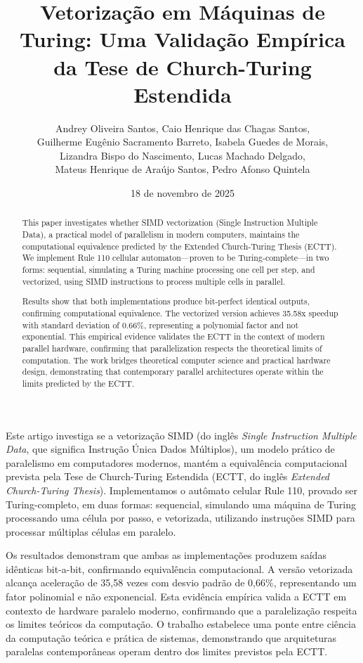 \documentclass[12pt]{article}
\title{Vetorização em Máquinas de Turing: Uma Validação Empírica da Tese de Church-Turing Estendida}
\author{
Andrey Oliveira Santos, Caio Henrique das Chagas Santos, \\
Guilherme Eugênio Sacramento Barreto, Isabela Guedes de Morais, \\
Lizandra Bispo do Nascimento, Lucas Machado Delgado, \\
Mateus Henrique de Araújo Santos, Pedro Afonso Quintela
}
\date{18 de novembro de 2025}
\affil{Universidade Tiradentes -- Sistemas de Informação}
\begin{document}
\maketitle

\begin{abstract}

This paper investigates whether SIMD vectorization (Single Instruction Multiple Data), a practical model of parallelism in modern computers, maintains the computational equivalence predicted by the Extended Church-Turing Thesis (ECTT). We implement Rule 110 cellular automaton—proven to be Turing-complete—in two forms: sequential, simulating a Turing machine processing one cell per step, and vectorized, using SIMD instructions to process multiple cells in parallel.

Results show that both implementations produce bit-perfect identical outputs, confirming computational equivalence. The vectorized version achieves 35.58x speedup with standard deviation of 0.66\%, representing a polynomial factor and not exponential. This empirical evidence validates the ECTT in the context of modern parallel hardware, confirming that parallelization respects the theoretical limits of computation. The work bridges theoretical computer science and practical hardware design, demonstrating that contemporary parallel architectures operate within the limits predicted by the ECTT.

\end{abstract}

\begin{resumo}

Este artigo investiga se a vetorização SIMD (do inglês \textit{Single Instruction Multiple Data}, que significa Instrução Única Dados Múltiplos), um modelo prático de paralelismo em computadores modernos, mantém a equivalência computacional prevista pela Tese de Church-Turing Estendida (ECTT, do inglês \textit{Extended Church-Turing Thesis}). Implementamos o autômato celular Rule 110, provado ser Turing-completo, em duas formas: sequencial, simulando uma máquina de Turing processando uma célula por passo, e vetorizada, utilizando instruções SIMD para processar múltiplas células em paralelo.

Os resultados demonstram que ambas as implementações produzem saídas idênticas bit-a-bit, confirmando equivalência computacional. A versão vetorizada alcança aceleração de 35,58 vezes com desvio padrão de 0,66\%, representando um fator polinomial e não exponencial. Esta evidência empírica valida a ECTT em contexto de hardware paralelo moderno, confirmando que a paralelização respeita os limites teóricos da computação. O trabalho estabelece uma ponte entre ciência da computação teórica e prática de sistemas, demonstrando que arquiteturas paralelas contemporâneas operam dentro dos limites previstos pela ECTT.

\end{resumo}
\end{document}
